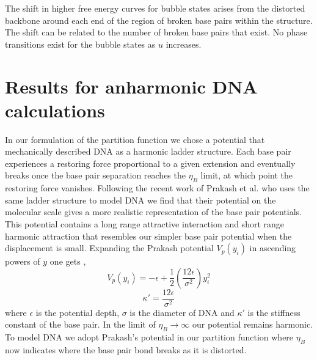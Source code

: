 The shift in higher free energy curves for bubble states arises from the distorted backbone around each end of the region of broken base pairs within the structure. The shift can be related to the number of broken base pairs that exist. No phase transitions exist for the bubble states as $u$ increases.

\newpage
\section{Results for anharmonic DNA calculations}

In our formulation of the partition function we chose a potential that mechanically described DNA as a harmonic ladder structure. Each base pair experiences a restoring force proportional to a given extension and eventually breaks once the base pair separation reaches the $\eta_B$ limit, at which point the restoring force vanishes. Following the recent work of Prakash et al. who uses the same ladder structure to model DNA we find that their potential on the molecular scale gives a more realistic representation of the base pair  potentials. This potential contains a long range attractive interaction and short range harmonic attraction that resembles our simpler base pair potential when the displacement is small. Expanding the Prakash potential $V_{p}\left(y_{i}\right)$ in ascending powers of $y$ one gets \cite{Prakash2011},
%
\begin{equation}
V_{p}\left(y_{i}\right)=-\epsilon + \frac{1}{2}\left(\frac{12\epsilon}{\sigma^2}\right)y_{i}^2
\end{equation}
%
\begin{equation}
\kappa'= \frac{12\epsilon}{\sigma^2}
\end{equation}
%
where $\epsilon$ is the potential depth, $\sigma$ is the diameter of DNA and $\kappa'$ is the stiffness constant of the base pair. In the limit of $\eta_B \rightarrow \infty$ our potential remains harmonic. To model DNA we adopt Prakash's potential in our partition function where $\eta_B$ now indicates where the base pair bond breaks as it is distorted. 

